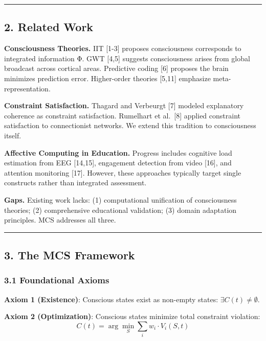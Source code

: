 \documentclass[
]{article}
\begin{document}
\begin{center}\rule{0.5\linewidth}{0.5pt}\end{center}

\subsection{2. Related Work}\label{related-work}

\textbf{Consciousness Theories.} IIT {[}1-3{]} proposes consciousness
corresponds to integrated information Φ. GWT {[}4,5{]} suggests
consciousness arises from global broadcast across cortical areas.
Predictive coding {[}6{]} proposes the brain minimizes prediction error.
Higher-order theories {[}5,11{]} emphasize meta-representation.

\textbf{Constraint Satisfaction.} Thagard and Verbeurgt {[}7{]} modeled
explanatory coherence as constraint satisfaction. Rumelhart et
al.~{[}8{]} applied constraint satisfaction to connectionist networks.
We extend this tradition to consciousness itself.

\textbf{Affective Computing in Education.} Progress includes cognitive
load estimation from EEG {[}14,15{]}, engagement detection from video
{[}16{]}, and attention monitoring {[}17{]}. However, these approaches
typically target single constructs rather than integrated assessment.

\textbf{Gaps.} Existing work lacks: (1) computational unification of
consciousness theories; (2) comprehensive educational validation; (3)
domain adaptation principles. MCS addresses all three.

\begin{center}\rule{0.5\linewidth}{0.5pt}\end{center}

\subsection{3. The MCS Framework}\label{the-mcs-framework}

\subsubsection{3.1 Foundational Axioms}\label{foundational-axioms}

\textbf{Axiom 1 (Existence)}: Conscious states exist as non-empty
states: \(\exists C(t) \neq \emptyset\).

\textbf{Axiom 2 (Optimization)}: Conscious states minimize total
constraint violation: \[C(t) = \arg\min_{S} \sum_i w_i \cdot V_i(S, t)\]
\end{document}
